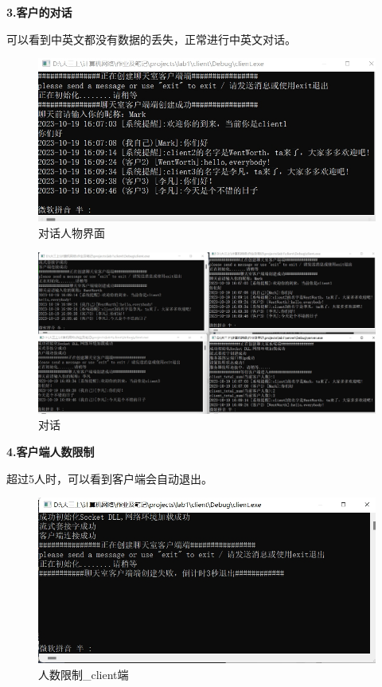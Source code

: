 \documentclass[12pt]{article}
\begin{document}
\textbf{3.客户的对话}

可以看到中英文都没有数据的丢失，正常进行中英文对话。
\begin{figure}[H]
        \centering
        \includegraphics[scale=0.45]{fig/14.png}
        \caption{对话人物界面}
       \label{fig:16}
\end{figure}

\begin{figure}[H]
        \centering
        \includegraphics[scale=0.3]{fig/11.jpg}
        \caption{对话}
       \label{fig:15}
\end{figure}

\textbf{4.客户端人数限制}

超过5人时，可以看到客户端会自动退出。
\begin{figure}[H]
        \centering
        \includegraphics[scale=0.45]{fig/16.png}
        \caption{人数限制\_client端}
       \label{fig:20}
\end{figure}
\end{document}
